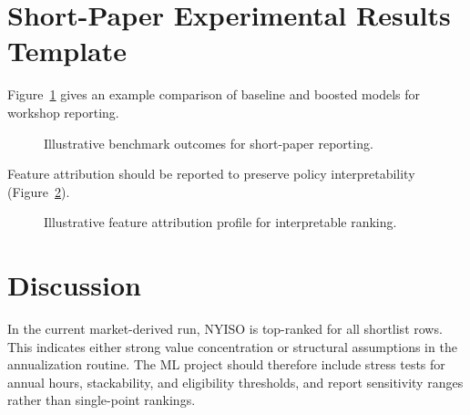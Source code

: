 \documentclass[11pt]{article}
\begin{document}
\section{Short-Paper Experimental Results Template}
Figure~\ref{fig:perf} gives an example comparison of baseline and boosted models for workshop reporting.

\begin{figure}[ht]
\centering
{}
\caption{Illustrative benchmark outcomes for short-paper reporting.}
\label{fig:perf}
\end{figure}

Feature attribution should be reported to preserve policy interpretability (Figure~\ref{fig:shap}).

\begin{figure}[ht]
\centering
{}
\caption{Illustrative feature attribution profile for interpretable ranking.}
\label{fig:shap}
\end{figure}

\section{Discussion}
In the current market-derived run, NYISO is top-ranked for all shortlist rows. This indicates either strong value concentration or structural assumptions in the annualization routine. The ML project should therefore include stress tests for annual hours, stackability, and eligibility thresholds, and report sensitivity ranges rather than single-point rankings.
\end{document}
